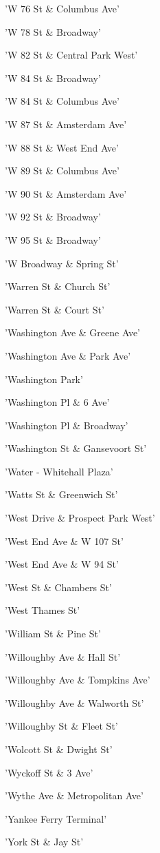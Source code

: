 \documentclass[11pt]{article}
\begin{document}
\begin{enumerate*}
\item 'W 76 St \& Columbus Ave'
\item 'W 78 St \& Broadway'
\item 'W 82 St \& Central Park West'
\item 'W 84 St \& Broadway'
\item 'W 84 St \& Columbus Ave'
\item 'W 87 St  \& Amsterdam Ave'
\item 'W 88 St \& West End Ave'
\item 'W 89 St \& Columbus Ave'
\item 'W 90 St \& Amsterdam Ave'
\item 'W 92 St \& Broadway'
\item 'W 95 St \& Broadway'
\item 'W Broadway \& Spring St'
\item 'Warren St \& Church St'
\item 'Warren St \& Court St'
\item 'Washington Ave \& Greene Ave'
\item 'Washington Ave \& Park Ave'
\item 'Washington Park'
\item 'Washington Pl \& 6 Ave'
\item 'Washington Pl \& Broadway'
\item 'Washington St \& Gansevoort St'
\item 'Water - Whitehall Plaza'
\item 'Watts St \& Greenwich St'
\item 'West Drive \& Prospect Park West'
\item 'West End Ave \& W 107 St'
\item 'West End Ave \& W 94 St'
\item 'West St \& Chambers St'
\item 'West Thames St'
\item 'William St \& Pine St'
\item 'Willoughby Ave \& Hall St'
\item 'Willoughby Ave \& Tompkins Ave'
\item 'Willoughby Ave \& Walworth St'
\item 'Willoughby St \& Fleet St'
\item 'Wolcott St \& Dwight St'
\item 'Wyckoff St \& 3 Ave'
\item 'Wythe Ave \& Metropolitan Ave'
\item 'Yankee Ferry Terminal'
\item 'York St \& Jay St'
\end{enumerate*}
\end{document}
